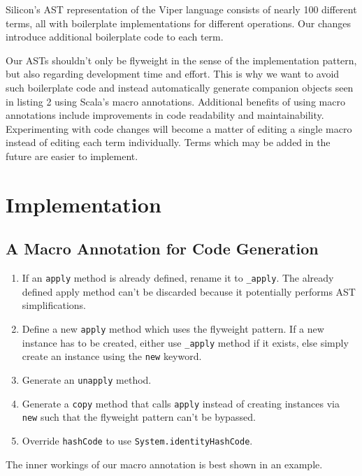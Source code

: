 \documentclass[11pt]{article}
\begin{document}
    Silicon's AST representation of the Viper language consists of nearly 100 different terms,
    all with boilerplate implementations for different operations.
    Our changes introduce additional boilerplate code to each term.

    Our ASTs shouldn't only be flyweight in the sense of the implementation pattern, but also
    regarding development time and effort. This is why we want to avoid such boilerplate
    code and instead automatically generate companion objects seen in listing 2 using Scala's macro annotations.
    Additional benefits of using macro annotations include improvements in code
    readability and maintainability. Experimenting with code changes will become a matter
    of editing a single macro instead of editing each term individually.
    Terms which may be added in the future are easier to implement.

    \newpage
    \section{Implementation}

    \subsection{A Macro Annotation for Code Generation}

    \begin{enumerate}
        \item If an \texttt{apply} method is already defined, rename it to \texttt{\_apply}.
            The already defined apply method can't be discarded because it potentially
            performs AST simplifications.
        \item Define a new \texttt{apply} method which uses the flyweight pattern.
            If a new instance has to be created, either use \texttt{\_apply} method
            if it exists, else simply create an instance using the \texttt{new} keyword.
        \item Generate an \texttt{unapply} method.
        \item Generate a \texttt{copy} method that calls \texttt{apply} instead of creating
            instances via \texttt{new} such that the flyweight pattern can't be bypassed.
        \item Override \texttt{hashCode} to use \texttt{System.identityHashCode}.
    \end{enumerate}

    The inner workings of our macro annotation is best shown in an example.
\end{document}
